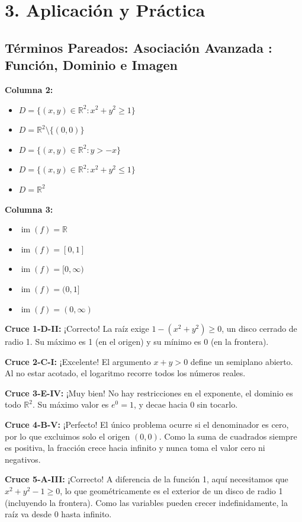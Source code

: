 \documentclass[11pt]{article}
\newenvironment{aplicacion}{%
  \section*{3. Aplicación y Práctica}%
}{}
\newenvironment{pareadostrescolumnas}[1]{\subsection*{Términos Pareados: #1}}{\vspace{0.3cm}}
\newcommand{\columnaII}[1]{\textbf{Columna 2:}\begin{itemize}#1\end{itemize}}
\newcommand{\columnaIII}[1]{\textbf{Columna 3:}\begin{itemize}#1\end{itemize}}
\newcommand{\pareotres}[2]{\textbf{Cruce #1:} #2\par}
\begin{document}
\begin{aplicacion}
\begin{pareadostrescolumnas}{Asociación Avanzada : Función, Dominio e Imagen}
    \columnaII{
      \item $D = \{(x,y) \in \mathbb{R}^2 \colon x^2 + y^2 \geq 1\}$
      \item $D = \mathbb{R}^2 \setminus \{(0,0)\}$
      \item $D = \{(x,y) \in \mathbb{R}^2 \colon y > -x\}$
      \item $D = \{(x,y) \in \mathbb{R}^2 \colon x^2 + y^2 \leq 1\}$
      \item $D = \mathbb{R}^2$
    }
    
    \columnaIII{
      \item $\operatorname{im}(f) = \mathbb{R}$
      \item $\operatorname{im}(f) = [0, 1]$
      \item $\operatorname{im}(f) = [0, \infty)$
      \item $\operatorname{im}(f) = (0, 1]$
      \item $\operatorname{im}(f) = (0, \infty)$
    }

    \pareotres{1-D-II}{¡Correcto! La raíz exige $1 - (x^2+y^2) \geq 0$, un disco cerrado de radio 1. Su máximo es 1 (en el origen) y su mínimo es 0 (en la frontera).}
    \pareotres{2-C-I}{¡Excelente! El argumento $x+y>0$ define un semiplano abierto. Al no estar acotado, el logaritmo recorre todos los números reales.}
    \pareotres{3-E-IV}{¡Muy bien! No hay restricciones en el exponente, el dominio es todo $\mathbb{R}^2$. Su máximo valor es $e^0 = 1$, y decae hacia 0 sin tocarlo.}
    \pareotres{4-B-V}{¡Perfecto! El único problema ocurre si el denominador es cero, por lo que excluimos solo el origen $(0,0)$. Como la suma de cuadrados siempre es positiva, la fracción crece hacia infinito y nunca toma el valor cero ni negativos.}
    \pareotres{5-A-III}{¡Correcto! A diferencia de la función 1, aquí necesitamos que $x^2 + y^2 - 1 \geq 0$, lo que geométricamente es el exterior de un disco de radio 1 (incluyendo la frontera). Como las variables pueden crecer indefinidamente, la raíz va desde 0 hasta infinito.}

  \end{pareadostrescolumnas}

\end{aplicacion}
\end{document}
